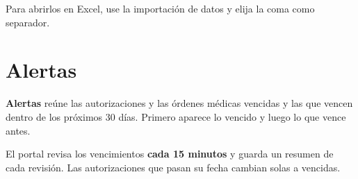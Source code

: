 Para abrirlos en Excel, use la importación de datos y elija la coma como
separador.

\section{Alertas}


\textbf{Alertas} reúne las autorizaciones y las órdenes médicas vencidas y las
que vencen dentro de los próximos 30 días. Primero aparece lo vencido y luego
lo que vence antes.

El portal revisa los vencimientos \textbf{cada 15 minutos} y guarda un resumen
de cada revisión. Las autorizaciones que pasan su fecha cambian solas a
vencidas.
